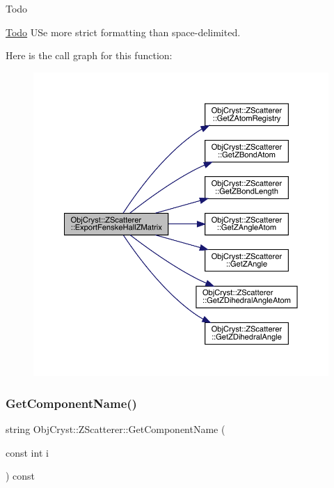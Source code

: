 \begin{DoxyRefDesc}{Todo}
\item[\mbox{\hyperlink{todo__todo000017}{Todo}}]U\+Se more strict formatting than space-\/delimited. \end{DoxyRefDesc}
Here is the call graph for this function\+:
\nopagebreak
\begin{figure}[H]
\begin{center}
\leavevmode
\includegraphics[width=350pt]{class_obj_cryst_1_1_z_scatterer_a551fabc1d57cab02e957946dcfa1aae7_cgraph}
\end{center}
\end{figure}
\mbox{\label{class_obj_cryst_1_1_z_scatterer_a8202be8515c4f9117b666a22724df13c}} 
\subsubsection{\texorpdfstring{GetComponentName()}{GetComponentName()}}
{\footnotesize\ttfamily string Obj\+Cryst\+::\+Z\+Scatterer\+::\+Get\+Component\+Name (\begin{DoxyParamCaption}\item[{const int}]{i }\end{DoxyParamCaption}) const\hspace{0.3cm}{\ttfamily [virtual]}}

